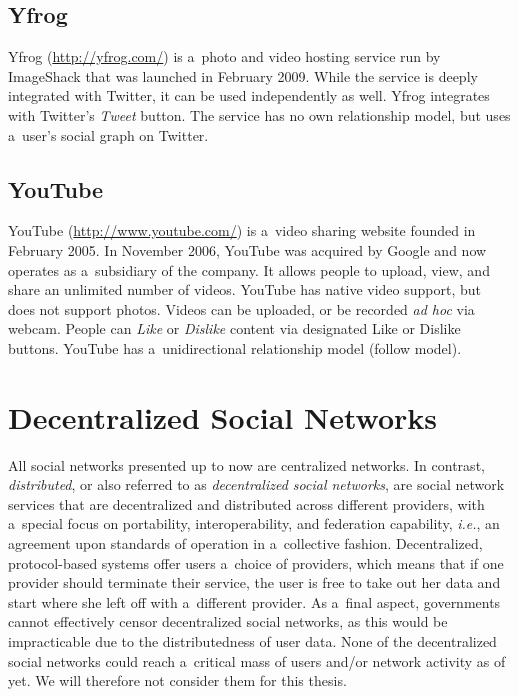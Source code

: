 \subsection{Yfrog}

Yfrog (\url{http://yfrog.com/})
is a~photo and video hosting service run by ImageShack
that was launched in February 2009.
While the service is deeply integrated with Twitter,
it can be used independently as well.
Yfrog integrates with Twitter's \emph{Tweet} button.
The service has no own relationship model,
but uses a~user's social graph on Twitter.

\subsection{YouTube}

YouTube (\url{http://www.youtube.com/})
is a~video sharing website founded in February 2005.
In November 2006, YouTube was acquired by Google
and now operates as a~subsidiary of the company.
It allows people to upload, view,
and share an unlimited number of videos.
YouTube has native video support, but does not support photos.
Videos can be uploaded, or be recorded \emph{ad hoc} via webcam.
People can \emph{Like} or \emph{Dislike} content
via designated Like or Dislike buttons.
YouTube has a~unidirectional relationship model (follow model).

\section{Decentralized Social Networks}
All social networks presented up to now are centralized networks.
In contrast, \emph{distributed}, or also referred to as
\emph{decentralized social networks}, are
social network services that are decentralized and distributed
across different providers, with a~special focus on
portability, interoperability, and federation capability,
\emph{i.e.}, an agreement upon standards of operation
in a~collective fashion.
Decentralized, protocol-based systems
offer users a~choice of providers, which means
that if one provider should terminate their service,
the user is free to take out her data and start
where she left off with a~different provider.
As a~final aspect, governments cannot effectively censor
decentralized social networks,
as this would be impracticable
due to the distributedness of user data.
None of the decentralized social networks could reach
a~critical mass of users and/or network activity as of yet.
We will therefore not consider them for this thesis.

